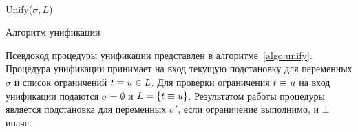 
\begin{algorithm}
\begin{algorithmic}[1]

  \Return {$\sigma$}
\EndIf
    
      \label{algo:line:unify-ctor-start}
      \Else~
        \Return {$\bot$}
      \EndIf
    \EndCase \label{algo:line:unify-ctor-end}
    
     \label{algo:line:unify-var-var-start}
    \EndCase \label{algo:line:unify-var-var-end}
    
     \label{algo:line:unify-var-term-start}
        \Return {$\bot$}
      \Else 
      \EndIf
    \EndCase \label{algo:line:unify-var-term-end}
    
  \EndSwitch
  
  \Return Unify($\sigma,L$)
\EndProcedure

\end{algorithmic}
\caption{Алгоритм унификации}
\label{algo:unify}
\end{algorithm}

Псевдокод процедуры унификации представлен в алгоритме~\ref{algo:unify}.
Процедура унификации принимает на вход 
текущую подстановку для переменных $\sigma$ и
список ограничений $t \equiv u \in L$.
Для проверки ограничения $t \equiv u$ 
на вход унификации подаются $\sigma = \emptyset$ и $L = \{t \equiv u\}$.
Результатом работы процедуры является подстановка для переменных $\sigma'$,
если ограничение выполнимо, и $\bot$ иначе.

